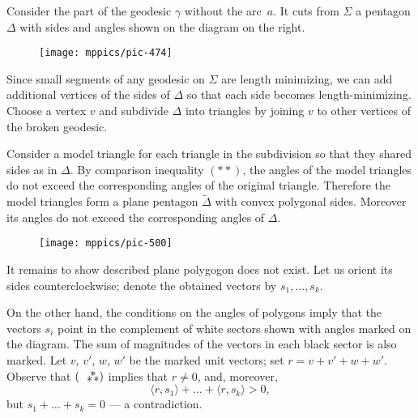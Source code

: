 \documentclass[oneside,a4paper]{amsart}
\begin{document}
Consider the part of the geodesic $\gamma$ without the arc~$a$.
It cuts from $\Sigma$ a pentagon $\Delta$ with sides and angles shown on the diagram on the right.

\begin{wrapfigure}{r}{50 mm}
\vskip-0mm
\centering
\texttt{[image: mppics/pic-474]}
\vskip8mm
\end{wrapfigure}

Since small segments of any geodesic on $\Sigma$ are length minimizing, we can add additional vertices of the sides of $\Delta$ so that each side becomes length-minimizing.
Choose a vertex $v$ and subdivide $\Delta$ into triangles by joining $v$ to other vertices of the broken geodesic.

Consider a model triangle for each triangle in the subdivision so that they shared sides as in $\Delta$.
By comparison inequality $({*}{*})$, the angles of the model triangles do not exceed the corresponding angles of the original triangle.
Therefore the model triangles form a plane pentagon $\tilde\Delta$ with convex polygonal sides.
Moreover its angles do not exceed the corresponding angles of $\Delta$.

\begin{wrapfigure}{r}{50 mm}
\vskip-4mm
\centering
\texttt{[image: mppics/pic-500]}
\vskip0mm
\end{wrapfigure}

It remains to show described plane polygogon does not exist.
Let us orient its  sides counterclockwise;
denote the obtained vectors by $s_1,\dots,s_k$.

On the other hand, the conditions on the angles of polygons imply that the vectors $s_i$ point in the complement of white sectors shown with angles marked on the diagram.
The sum of magnitudes of the vectors in each black sector is also marked.
Let $v$, $v'$, $w$, $w'$ be the marked unit vectors;
set $r=v+v'+w+w'$.
Observe that $(\asterism)$ implies that $r\ne 0$,
and, moreover, 
\[\langle r,s_1\rangle+\dots+\langle r,s_k\rangle>0,\]
but  $s_1+\dots+s_k=0$ --- a contradiction.


{\sloppy
\printbibliography[heading=bibintoc]
\fussy
}
\end{document}
